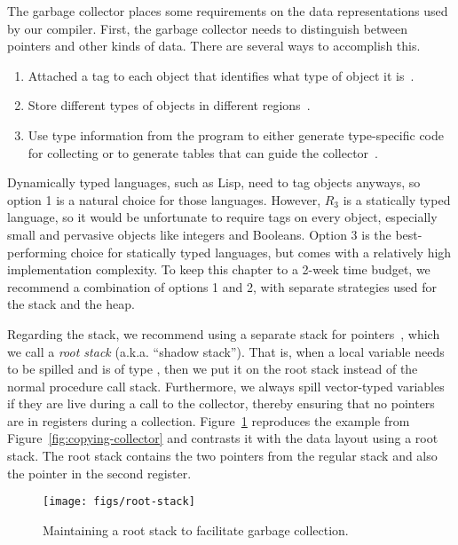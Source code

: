 \documentclass[11pt]{book}
\begin{document}
The garbage collector places some requirements on the data
representations used by our compiler. First, the garbage collector
needs to distinguish between pointers and other kinds of data. There
are several ways to accomplish this.
\begin{enumerate}
\item Attached a tag to each object that identifies what type of
  object it is~\citep{McCarthy:1960dz}.
\item Store different types of objects in different
  regions~\citep{Steele:1977ab}.
\item Use type information from the program to either generate
  type-specific code for collecting or to generate tables that can
  guide the
  collector~\citep{Appel:1989aa,Goldberg:1991aa,Diwan:1992aa}.
\end{enumerate}
Dynamically typed languages, such as Lisp, need to tag objects
anyways, so option 1 is a natural choice for those languages.
However, $R_3$ is a statically typed language, so it would be
unfortunate to require tags on every object, especially small and
pervasive objects like integers and Booleans.  Option 3 is the
best-performing choice for statically typed languages, but comes with
a relatively high implementation complexity. To keep this chapter to a
2-week time budget, we recommend a combination of options 1 and 2,
with separate strategies used for the stack and the heap.

Regarding the stack, we recommend using a separate stack for
pointers~\citep{Siebert:2001aa,Henderson:2002aa,Baker:2009aa}, which
we call a \emph{root stack} (a.k.a. ``shadow stack''). That is, when a
local variable needs to be spilled and is of type , then we put it on the root stack instead
of the normal procedure call stack. Furthermore, we always spill
vector-typed variables if they are live during a call to the
collector, thereby ensuring that no pointers are in registers during a
collection. Figure~\ref{fig:shadow-stack} reproduces the example from
Figure~\ref{fig:copying-collector} and contrasts it with the data
layout using a root stack. The root stack contains the two pointers
from the regular stack and also the pointer in the second
register.

\begin{figure}[tbp]
\centering \texttt{[image: figs/root-stack]}
\caption{Maintaining a root stack to facilitate garbage collection.}
\label{fig:shadow-stack}
\end{figure}
\end{document}
